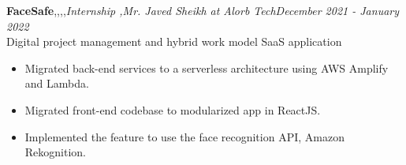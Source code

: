 \textbf{FaceSafe}\sep\py\sep\js\sep\aws\sep{\it Internship \sep Mr. Javed Sheikh at Alorb Tech}\hfill {\sl \small December 2021 - January 2022}\\
\vspace{-5pt}
\emerrow Digital project management and hybrid work model SaaS application
\begin{itemize}[itemsep = -1.3 mm, leftmargin=*]
\item Migrated back-end services to a serverless architecture using AWS Amplify and Lambda.
\item Migrated front-end codebase to modularized app in ReactJS.
\item Implemented the feature to use the face recognition API, Amazon Rekognition.
\end{itemize}